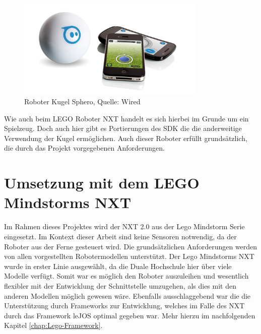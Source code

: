 \begin{figure}[H]
\includegraphics[width=0.8\textwidth]{img/sphero/Sphero1.jpg}
\caption[Roboter Kugel Sphero]{Roboter Kugel Sphero, Quelle: Wired\footnotemark[20]}
\label{fig:sphero}
\end{figure}


\clearpage

Wie auch beim LEGO Roboter NXT handelt es sich hierbei im Grunde um ein Spielzeug. Doch auch hier gibt es Portierungen des SDK die die anderweitige Verwendung der Kugel erm\"oglichen. Auch dieser Roboter erf\"ullt grunds\"atzlich, die durch das Projekt vorgegebenen Anforderungen. 

\section{Umsetzung mit dem LEGO Mindstorms NXT}

Im Rahmen dieses Projektes wird der NXT 2.0 aus der Lego Mindstorm Serie eingesetzt\footnotemark[21]. Im Kontext dieser Arbeit sind keine Sensoren notwendig, da der Roboter aus der Ferne gesteuert wird. Die grunds\"atzlichen Anforderungen werden von allen vorgestellten Robotermodellen unterst\"utzt. Der Lego Mindstorms NXT wurde in erster Linie ausgew\"ahlt, da die Duale Hochschule hier \"uber viele Modelle verf\"ugt. Somit war es m\"oglich den Roboter auszuleihen und wesentlich flexibler mit der Entwicklung der Schnittstelle umzugehen, als dies mit den anderen Modellen m\"oglich gewesen w\"are. Ebenfalls ausschlaggebend war die die Unterst\"utzung durch Frameworks zur Entwicklung, welches im Falle des NXT durch das Framework leJOS optimal gegeben war. Mehr hierzu im nachfolgenden Kapitel \ref{chap:Lego-Framework}.


